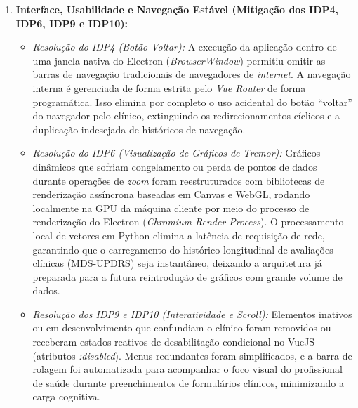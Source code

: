 \begin{enumerate}
    \item \textbf{Interface, Usabilidade e Navegação Estável (Mitigação dos IDP4, IDP6, IDP9 e IDP10):}
    \begin{itemize}
        \item \textit{Resolução do IDP4 (Botão Voltar):} A execução da aplicação dentro de uma janela nativa do Electron (\textit{BrowserWindow}) permitiu omitir as barras de navegação tradicionais de navegadores de \textit{internet}. A navegação interna é gerenciada de forma estrita pelo \textit{Vue Router} de forma programática. Isso elimina por completo o uso acidental do botão ``voltar'' do navegador pelo clínico, extinguindo os redirecionamentos cíclicos e a duplicação indesejada de históricos de navegação.
        \item \textit{Resolução do IDP6 (Visualização de Gráficos de Tremor):} Gráficos dinâmicos que sofriam congelamento ou perda de pontos de dados durante operações de \textit{zoom} foram reestruturados com bibliotecas de renderização assíncrona baseadas em Canvas e WebGL, rodando localmente na GPU da máquina cliente por meio do processo de renderização do Electron (\textit{Chromium Render Process}). O processamento local de vetores em Python elimina a latência de requisição de rede, garantindo que o carregamento do histórico longitudinal de avaliações clínicas (MDS-UPDRS) seja instantâneo, deixando a arquitetura já preparada para a futura reintrodução de gráficos com grande volume de dados.
        \item \textit{Resolução dos IDP9 e IDP10 (Interatividade e Scroll):} Elementos inativos ou em desenvolvimento que confundiam o clínico foram removidos ou receberam estados reativos de desabilitação condicional no VueJS (atributos \textit{:disabled}). Menus redundantes foram simplificados, e a barra de rolagem foi automatizada para acompanhar o foco visual do profissional de saúde durante preenchimentos de formulários clínicos, minimizando a carga cognitiva.
    \end{itemize}


\end{enumerate}
